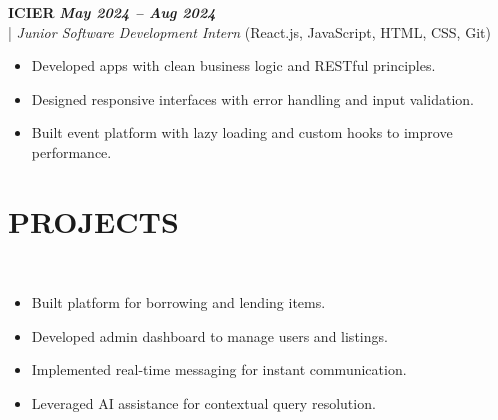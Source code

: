 \documentclass[10pt,a4paper]{article}
\begin{document}
\vspace{5pt}
\noindent
   \textbf{ICIER} \hfill \textit{\textbf{May 2024 -- Aug 2024}} \\
  \;|\;
  \textit{Junior Software Development Intern} (React.js, JavaScript, HTML, CSS, Git)
  \hfill

\begin{itemize}



\item Developed apps with clean business logic and RESTful principles.



\item Designed responsive interfaces with error handling and input validation.



\item Built event platform with lazy loading and custom hooks to improve performance.



\end{itemize}
\section*{PROJECTS}
\small

\noindent
{}\\[-12pt]
\begin{itemize}

\item Built platform for borrowing and lending items.

\item Developed admin dashboard to manage users and listings.

\item Implemented real-time messaging for instant communication.

\item Leveraged AI assistance for contextual query resolution.

\end{itemize}

\noindent
{}\\[-12pt]
\end{document}
